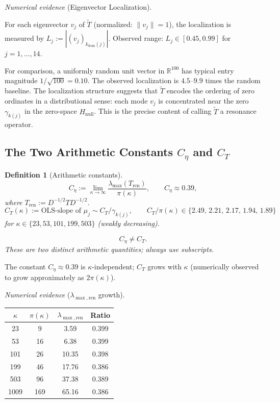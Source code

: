 \documentclass[11pt]{article}
\newtheorem{definition}[theorem]{Definition}
\newcommand{\Hnull}{H_{\mathrm{null}}}
\newcommand{\Tren}{T_{\mathrm{ren}}}
\newcommand{\Tt}{\widetilde{T}}
\newcommand{\Ceta}{C_{\eta}}
\newcommand{\CT}{C_{T}}
\newcommand{\kdom}{k_{\mathrm{dom}}}
\begin{document}
\emph{Numerical evidence} (Eigenvector Localization).

For each eigenvector $v_j$ of $\Tt$ (normalized: $\|v_j\|=1$),
the localization is measured by $L_j := |(v_j)_{\kdom(j)}|$.
Observed range: $L_j\in[0.45,0.99]$ for $j=1,\ldots,14$.

For comparison, a uniformly random unit vector in $\mathbb{R}^{100}$
has typical entry magnitude $1/\sqrt{100} = 0.10$.
The observed localization is $4.5$--$9.9$ times the random baseline.
The localization structure suggests that $\Tt$ encodes
the ordering of zero ordinates in a distributional sense:
each mode $v_j$ is concentrated near the zero $\gamma_{k(j)}$
in the zero-space $\Hnull$.
This is the precise content of calling $\Tt$ a resonance operator.

\subsection{The Two Arithmetic Constants $\Ceta$ and $\CT$}

\begin{definition}[Arithmetic constants]\label{def:constants}
\[
\Ceta := \lim_{\kappa\to\infty}\frac{\lambda_{\max}(\Tren)}{\pi(\kappa)},
\qquad\Ceta\approx 0.39,
\]
where $\Tren := D^{-1/2}TD^{-1/2}$.
\[
\CT(\kappa) := \text{OLS-slope of } \mu_j\sim\CT/\gamma_{k(j)},
\qquad \CT/\pi(\kappa) \in \{2.49,\,2.21,\,2.17,\,1.94,\,1.89\}
\]
for $\kappa\in\{23,53,101,199,503\}$ (weakly decreasing).

\[
\Ceta \neq \CT.
\]
\emph{These are two distinct arithmetic quantities; always use subscripts.}
\end{definition}

The constant $\Ceta\approx 0.39$ is $\kappa$-independent;
$\CT$ grows with $\kappa$ (numerically observed to grow approximately as $2\pi(\kappa)$).

\emph{Numerical evidence} ($\lambda_{\max,\mathrm{ren}}$ growth).

\begin{center}
\begin{tabular}{cccc}
\toprule
$\kappa$ & $\pi(\kappa)$ & $\lambda_{\max,\mathrm{ren}}$ & Ratio \\
\midrule
23  & 9   & 3.59  & 0.399 \\
53  & 16  & 6.38  & 0.399 \\
101 & 26  & 10.35 & 0.398 \\
199 & 46  & 17.76 & 0.386 \\
503 & 96  & 37.38 & 0.389 \\
1009 & 169 & 65.16 & 0.386 \\
\bottomrule
\end{tabular}
\end{center}
\end{document}
